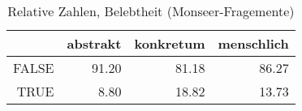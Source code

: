 \begin{table}[ht]
\centering
\begin{tabular}{rrrr}
  \hline
 & abstrakt & konkretum & menschlich \\ 
  \hline
FALSE & 91.20 & 81.18 & 86.27 \\ 
  TRUE & 8.80 & 18.82 & 13.73 \\ 
   \hline
\end{tabular}
\caption{Relative Zahlen, Belebtheit  (Monseer-Fragemente)} 
\end{table}
